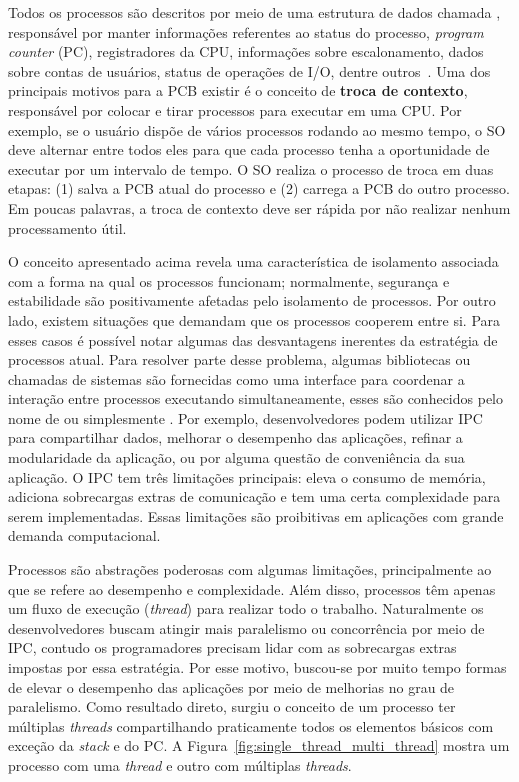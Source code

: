 Todos os processos são descritos por meio de uma estrutura de dados chamada
, responsável por manter
informações referentes ao status do processo, \emph{program counter} (PC),
registradores da CPU, informações sobre escalonamento, dados sobre contas de
usuários, status de operações de I/O, dentre outros~\citep{silberschatz}.
Uma dos principais motivos para a PCB existir é o conceito de \textbf{troca de
contexto}, responsável por colocar e tirar processos para executar em uma CPU.
Por exemplo, se o usuário dispõe de vários processos rodando ao mesmo tempo, o
SO deve alternar entre todos eles para que cada processo tenha a oportunidade
de executar por um intervalo de tempo. O SO realiza o processo de troca em duas
etapas: (1) salva a PCB atual do processo e (2) carrega a PCB do outro
processo. Em poucas palavras, a troca de contexto deve ser rápida por não
realizar nenhum processamento útil.

O conceito apresentado acima revela uma característica de isolamento associada
com a forma na qual os processos funcionam; normalmente, segurança e
estabilidade são positivamente afetadas pelo isolamento de processos. Por outro
lado, existem situações que demandam que os processos cooperem entre si. Para
esses casos é possível notar algumas das desvantagens inerentes da estratégia
de processos atual. Para resolver parte desse problema, algumas bibliotecas ou
chamadas de sistemas são fornecidas como uma interface para coordenar a
interação entre processos executando simultaneamente, esses são conhecidos pelo
nome de  ou simplesmente
. Por exemplo, desenvolvedores podem utilizar IPC para
compartilhar dados, melhorar o desempenho das aplicações, refinar a
modularidade da aplicação, ou por alguma questão de conveniência da sua
aplicação. O IPC tem três limitações principais: eleva o consumo de memória,
adiciona sobrecargas extras de comunicação e tem uma certa complexidade para
serem implementadas. Essas limitações são proibitivas em aplicações com grande
demanda computacional.

Processos são abstrações poderosas com algumas
limitações, principalmente ao que se refere ao desempenho e complexidade. Além
disso, processos têm apenas um fluxo de execução (\textit{thread}) para
realizar todo o trabalho. Naturalmente os desenvolvedores buscam atingir mais
paralelismo ou concorrência por meio de IPC, contudo os programadores precisam
lidar com as sobrecargas extras impostas por essa estratégia. Por esse
motivo, buscou-se por muito tempo formas de elevar o desempenho das
aplicações por meio de melhorias no grau de paralelismo. Como resultado direto,
surgiu o conceito de um processo ter múltiplas \emph{threads}
compartilhando praticamente todos os elementos básicos com exceção da
\emph{stack} e do PC. A Figura~\ref{fig:single_thread_multi_thread} mostra um
processo com uma \emph{thread} e outro com múltiplas \emph{threads}.

